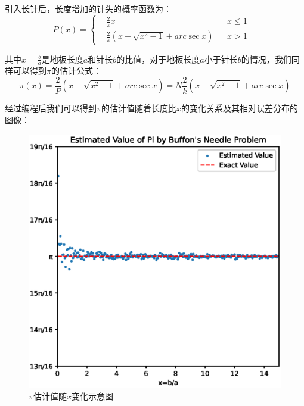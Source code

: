 \documentclass[12pt,a4paper]{article}%
\begin{document}
引入长针后，长度增加的针头的概率函数为：
\[P(x)=\left\{
    \begin{aligned}
         & \frac{2}{\pi}x                                      &  & x\leq 1 & \\
         & \frac{2}{\pi}\left(x-\sqrt{x^2-1}+arc \sec x\right) &  & x>1     &
    \end{aligned}
    \right.
\]

其中$x=\frac{b}{a}$是地板长度$a$和针长$b$的比值，对于地板长度$a$小于针长$b$的情况，我们同样可以得到$\pi$的估计公式：
\[\pi(x)=\frac{2}{P}\left(x-\sqrt{x^2-1}+arc\sec x \right)=N\frac{2}{k}\left(x-\sqrt{x^2-1}+arc\sec x\right)\]

经过编程后我们可以得到$\pi$的估计值随着长度比$x$的变化关系及其相对误差分布的图像：

\begin{figure}[H]%
    \centering
    \begin{minipage}{0.48\textwidth}
        \centering
        \includegraphics[width=1.1\textwidth]{Pi长短针估计值.eps}
        \caption{\fontsize{10pt}{15pt}\selectfont $\pi$估计值随$x$变化示意图}
    \end{minipage}
    \hspace{0cm}%
    \hfill%
    \begin{minipage}{0.48\textwidth}
        \centering

\end{minipage}
\end{figure}
\end{document}
